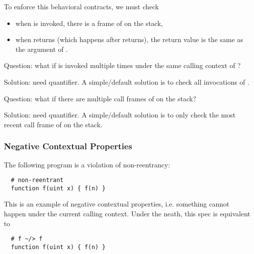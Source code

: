 To enforce this behavioral contracts, we must check
\begin{itemize}
	\item when  is invoked, there is a frame of  on the stack,
	\item when  returns (which happens after  returns), the return value
	      is the same as the argument of .
\end{itemize}

Question: what if  is invoked multiple times under the same calling context of
?

Solution: need quantifier. A simple/default solution is to check all
invocations of .

Question: what if there are multiple call frames of  on the stack?

Solution: need quantifier. A simple/default solution is to only check
the most recent call frame of  on the stack.


\subsubsection{Negative Contextual Properties}

The following program is a violation of non-reentrancy:

\begin{lstlisting}
  # non-reentrant
  function f(uint x) { f(n) }
\end{lstlisting}

This is an example of negative contextual properties, i.e. something cannot
happen under the current calling context. Under the neath, this spec is
equivalent to

\begin{lstlisting}
  # f ~/> f
  function f(uint x) { f(n) }
\end{lstlisting}

